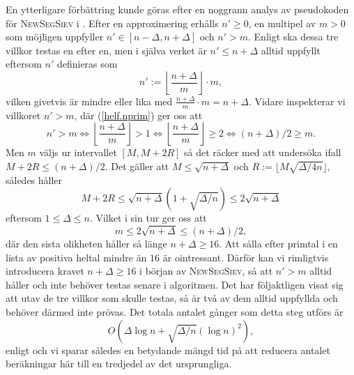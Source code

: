 En ytterligare förbättring kunde göras efter en noggrann analys av pseudokoden för \textsc{NewSegSiev} i \cite[s.338]{HaraldSieve}.
Efter en approximering erhålls $n'\geq0$, en multipel av $m>0$ som möjligen uppfyller $n'\in[n-\Delta,n+\Delta]$ och $n'>m$.
Enligt \cite{HaraldSieve} ska dessa tre villkor testas en efter en,
men i själva verket är $n'\leq n+\Delta$ alltid uppfyllt eftersom $n'$ definieras som
\begin{equation} \label{helf.nprim}
    n' := \left\lfloor \frac{n+\Delta}{m} \right\rfloor\cdot m,
\end{equation}
vilken givetvis är mindre eller lika med $\frac{n+\Delta}{m}\cdot m = n+\Delta$. 
Vidare inspekterar vi villkoret $n'>m$, där (\ref{helf.nprim}) ger oss att 
\begin{equation*}
    n'>m \iff
    \left\lfloor \frac{n+\Delta}{m} \right\rfloor > 1 \iff
    \left\lfloor \frac{n+\Delta}{m} \right\rfloor \geq 2 \iff
    (n+\Delta)/2\geq m.
\end{equation*}
Men $m$ väljs ur intervallet $[M,M+2R]$ så det räcker med att undersöka ifall $M+2R\leq(n+\Delta)/2$. 
Det gäller att $M\leq\sqrt{n+\Delta}$ och $R:=\lfloor M\sqrt{\Delta/4n}\rfloor$,
således håller 
\begin{equation*}
    M+2R \leq
    \sqrt{n+\Delta}\left(1+ \sqrt{\Delta/n}\right) \leq 2\sqrt{n+\Delta}
\end{equation*}
eftersom $1\leq\Delta\leq n$. Vilket i sin tur ger oss att
\begin{equation*}
    m \leq 2\sqrt{n+\Delta} \leq (n+\Delta)/2,
\end{equation*}
där den sista olikheten håller så länge $n+\Delta\geq16$. 
Att sålla efter primtal i en lista av positiva heltal mindre än $16$ är ointressant.
Därför kan vi rimligtvis introducera kravet $n+\Delta\geq16$ i början av \textsc{NewSegSiev},
så att $n'>m$ alltid håller och inte behöver testas senare i algoritmen.
Det har följaktligen visat sig att utav de tre villkor som skulle testas, 
så är två av dem alltid uppfyllda och behöver därmed inte prövas.
Det totala antalet gånger som detta steg utförs är
\begin{equation*}
    O\left(\Delta\log n + \sqrt{\Delta/n}(\log n)^2\right),
\end{equation*}
enligt \cite[s.346]{HaraldSieve} och vi sparar således en betydande mängd tid på att reducera antalet beräkningar här till en tredjedel av det ursprungliga.

